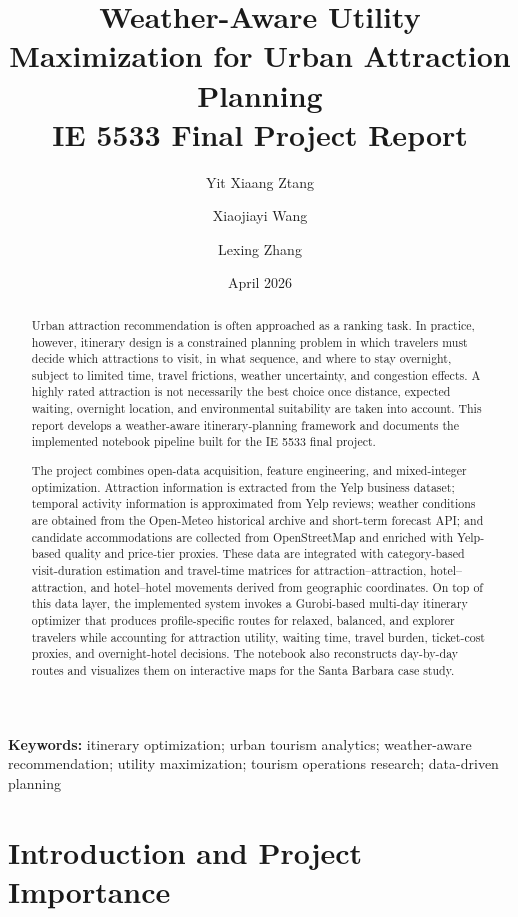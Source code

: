 \documentclass[12pt,a4paper]{article}
\title{Weather-Aware Utility Maximization for Urban Attraction Planning\\[2mm]
\large IE 5533 Final Project Report}
\author{
Yit Xiaang Ztang \and Xiaojiayi Wang \and Lexing Zhang
}
\date{April 2026}
\begin{document}
\maketitle

\begin{abstract}
Urban attraction recommendation is often approached as a ranking task. In practice, however, itinerary design is a constrained planning problem in which travelers must decide which attractions to visit, in what sequence, and where to stay overnight, subject to limited time, travel frictions, weather uncertainty, and congestion effects. A highly rated attraction is not necessarily the best choice once distance, expected waiting, overnight location, and environmental suitability are taken into account. This report develops a weather-aware itinerary-planning framework and documents the implemented notebook pipeline built for the IE 5533 final project.

The project combines open-data acquisition, feature engineering, and mixed-integer optimization. Attraction information is extracted from the Yelp business dataset; temporal activity information is approximated from Yelp reviews; weather conditions are obtained from the Open-Meteo historical archive and short-term forecast API; and candidate accommodations are collected from OpenStreetMap and enriched with Yelp-based quality and price-tier proxies. These data are integrated with category-based visit-duration estimation and travel-time matrices for attraction--attraction, hotel--attraction, and hotel--hotel movements derived from geographic coordinates. On top of this data layer, the implemented system invokes a Gurobi-based multi-day itinerary optimizer that produces profile-specific routes for relaxed, balanced, and explorer travelers while accounting for attraction utility, waiting time, travel burden, ticket-cost proxies, and overnight-hotel decisions. The notebook also reconstructs day-by-day routes and visualizes them on interactive maps for the Santa Barbara case study.
\end{abstract}

\noindent\textbf{Keywords:} itinerary optimization; urban tourism analytics; weather-aware recommendation; utility maximization; tourism operations research; data-driven planning

\section{Introduction and Project Importance}
\end{document}
